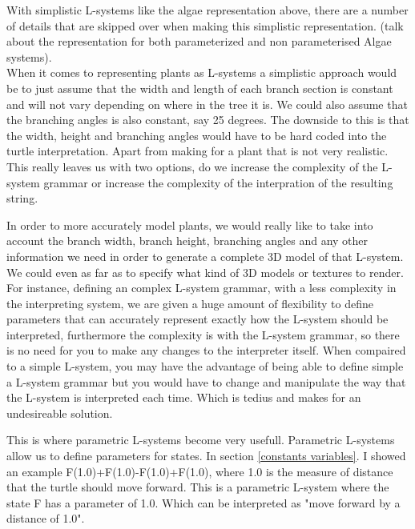 \begin{flushleft}

With simplistic L-systems like the algae representation above, there are a number of details that are skipped over when making this simplistic representation. (talk about the representation for both parameterized and non parameterised Algae systems). \\
When it comes to representing plants as L-systems a simplistic approach would be to just assume that the width and length of each branch section is constant and will not vary depending on where in the tree it is. We could also assume that the branching angles is also constant, say 25 degrees. The downside to this is that the width, height and branching angles would have to be hard coded into the turtle interpretation. Apart from making for a plant that is not very realistic. This really leaves us with two options, do we increase the complexity of the L-system grammar or increase the complexity of the interpration of the resulting string.\\

\vspace{5mm}

In order to more accurately model plants, we would really like to take into account the branch width, branch height, branching angles and any other information we need in order to generate a complete 3D model of that L-system. We could even as far as to specify what kind of 3D models or textures to render.\\
For instance, defining an complex L-system grammar, with a less complexity in the interpreting system, we are given a huge amount of flexibility to define parameters that can accurately represent exactly how the L-system should be interpreted, furthermore the complexity is with the L-system grammar, so there is no need for you to make any changes to the interpreter itself. When compaired to a simple L-system, you may have the advantage of being able to define simple a L-system grammar but you would have to change and manipulate the way that the L-system is interpreted each time. Which is tedius and makes for an undesireable solution. \\

\vspace{5mm}

This is where parametric L-systems become very usefull. Parametric L-systems allow us to define parameters for states. In section \ref{constants variables}. I showed an example F(1.0)+F(1.0)-F(1.0)+F(1.0), where 1.0 is the measure of distance that the turtle should move forward. This is a parametric L-system where the state F has a parameter of 1.0. Which can be interpreted as "move forward by a distance of 1.0".


\end{flushleft}

